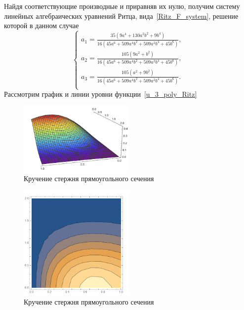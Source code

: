\documentclass[12pt, a4paper]{article}
\begin{document}
Найдя соответствующие производные и приравняв их нулю, получим систему линейных алгебраических уравнений  Ритца, вида~\eqref{Ritz_F_system}, решение которой
в данном случае
\begin{equation}\label{a_123_Ritz}
	\begin{cases}
	a_1 = \frac{35 (9a^4 + 130 a^2 b^2 + 9 b^4)}
	{16 (45 a^6 + 509 a^4 b^2 + 509 a^2 b^4 + 45 b^6)},\\
	a_2 = \frac{105 (9a^2 + b^2)}
	{16 (45 a^6 + 509 a^4 b^2 + 509 a^2 b^4 + 45 b^6)},\\
	a_3 = \frac{105 (a^2 + 9 b^2)}
	{16 (45 a^6 + 509 a^4 b^2 + 509 a^2 b^4 + 45 b^6)}.\\
	\end{cases}
\end{equation}
Рассмотрим график и линии уровни функции~\eqref{u_3_poly_Ritz}
\begin{figure}[!h]
	\centering
	\includegraphics[width=0.5\textwidth]{ritz_graph}%
	\caption{Кручение стержня прямоугольного сечения}
	\vspace*{-2mm}
	\label{pic1}
\end{figure}
\begin{figure}[!h]
	\centering
	\includegraphics[width=0.5\textwidth]{ritz_levels}%
	\caption{Кручение стержня прямоугольного сечения}
	\vspace*{-2mm}
	\label{pic1}
\end{figure}

\newpage
\end{document}
